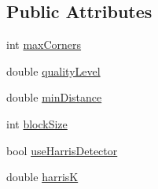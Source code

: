 \subsection*{Public Attributes}
\begin{DoxyCompactItemize}
\item 
int \hyperlink{classcv_1_1gpu_1_1GoodFeaturesToTrackDetector__GPU_ac1e628216d9e0cef86e53f3804660ea3}{max\-Corners}
\item 
double \hyperlink{classcv_1_1gpu_1_1GoodFeaturesToTrackDetector__GPU_a9f5f8a99c745336967c83605ab01adf4}{quality\-Level}
\item 
double \hyperlink{classcv_1_1gpu_1_1GoodFeaturesToTrackDetector__GPU_af0ea46c4aec5a06aece948dba21b17c3}{min\-Distance}
\item 
int \hyperlink{classcv_1_1gpu_1_1GoodFeaturesToTrackDetector__GPU_a06b3fe45e1f30303c8f50fd9d9d0fe04}{block\-Size}
\item 
bool \hyperlink{classcv_1_1gpu_1_1GoodFeaturesToTrackDetector__GPU_a5ae93a396eeb8eb0978026d57b14acea}{use\-Harris\-Detector}
\item 
double \hyperlink{classcv_1_1gpu_1_1GoodFeaturesToTrackDetector__GPU_a17f5ed8317c8f07eac81568971b07bc9}{harris\-K}
\end{DoxyCompactItemize}


